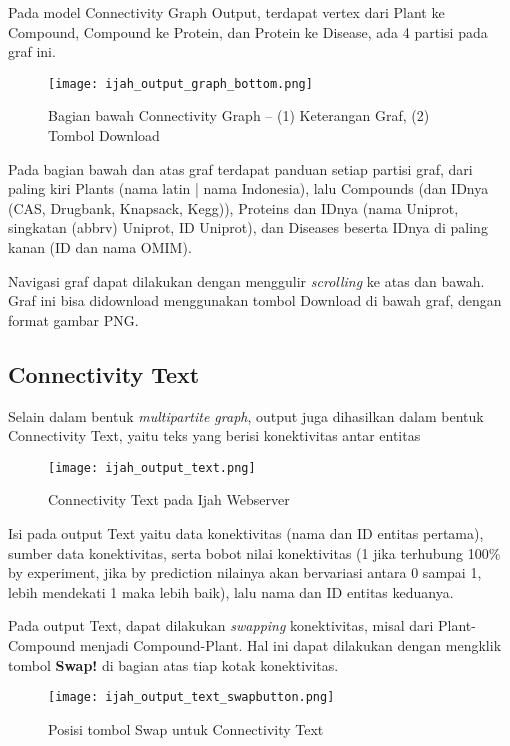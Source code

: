 	Pada model Connectivity Graph Output, terdapat vertex dari Plant ke Compound, Compound ke Protein, dan Protein ke Disease, ada 4 partisi pada graf ini.

	\begin{figure}[H]
	\centering
	\texttt{[image: ijah\_output\_graph\_bottom.png]}
	\caption{Bagian bawah Connectivity Graph -- (1) Keterangan Graf, (2) Tombol Download}
	\label{fig:ijah_output_graph_bottom}
	\end{figure}

	Pada bagian bawah dan atas graf terdapat panduan setiap partisi graf, dari paling kiri Plants (nama latin | nama Indonesia), lalu Compounds (dan IDnya (CAS, Drugbank, Knapsack, Kegg)), Proteins dan IDnya (nama Uniprot, singkatan (abbrv) Uniprot, ID Uniprot), dan Diseases beserta IDnya di paling kanan (ID dan nama OMIM).

	Navigasi graf dapat dilakukan dengan menggulir \emph{scrolling} ke atas dan bawah. Graf ini bisa didownload menggunakan tombol Download di bawah graf, dengan format gambar PNG.

	\subsection{Connectivity Text} \label{text}

	Selain dalam bentuk \emph{multipartite graph}, output juga dihasilkan dalam bentuk Connectivity Text, yaitu teks yang berisi konektivitas antar entitas

	\begin{figure}[H]
	\centering
	\texttt{[image: ijah\_output\_text.png]}
	\caption{Connectivity Text pada Ijah Webserver}
	\label{fig:ijah_output_text}
	\end{figure}

	Isi pada output Text yaitu data konektivitas (nama dan ID entitas pertama), sumber data konektivitas, serta bobot nilai konektivitas (1 jika terhubung 100\% by experiment, jika by prediction nilainya akan bervariasi antara 0 sampai 1, lebih mendekati 1 maka lebih baik), lalu nama dan ID entitas keduanya.

	Pada output Text, dapat dilakukan \emph{swapping} konektivitas, misal dari Plant-Compound menjadi Compound-Plant. Hal ini dapat dilakukan dengan mengklik tombol \textbf{Swap!} di bagian atas tiap kotak konektivitas.

	\begin{figure}[H]
	\centering
	\texttt{[image: ijah\_output\_text\_swapbutton.png]}
	\caption{Posisi tombol Swap untuk Connectivity Text}
	\label{fig:ijah_output_text_swapbutton}
	\end{figure}

